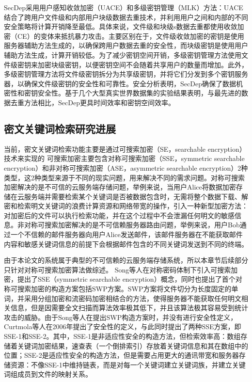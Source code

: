 \documentclass[promaster]{thesis-uestc}
\begin{document}
SecDep采用用户感知收敛加密（UACE）和多级密钥管理（MLK）方法：UACE结合了跨用户文件级和内部用户块级数据去重技术，并利用用户之间和内部的不同安全策略将计算开销降至最低。具体来说，文件级和块级s数据去重都使用收敛加密（CE）的变体来抵抗暴力攻击。主要区别在于，文件级收敛加密的密钥是使用服务器辅助方法生成的，以确保跨用户数据去重的安全性，而块级密钥是使用用户辅助方法生成，计算开销较低。为了减少密钥空间开销，多级密钥管理方法使用文件级密钥来加密块级密钥，以便密钥空间不会随着共享用户的数量而增加。此外，多级密钥管理方法将文件级密钥拆分为共享级密钥，并将它们分发到多个密钥服务器，以确保文件级密钥的安全性和可靠性。安全分析表明，SecDep确保了数据机密性和密钥安全性。基于几个大型真实世界数据集的实验结果表明，与最先进的数据去重方法相比，SecDep更具时间效率和密钥空间效率。

\subsection{密文关键词检索研究进展}\label{密文关键词检索技术研究进展}
当前，密文关键词检索功能主要是通过可搜索加密（SE，searchable encryption）技术来实现的
可搜索加密主要包含对称可搜索加密（SSE，symmetric searchable encryption）和非对称可搜索加密（ASE，asymmetric searchable encryption）2种类型，这2种类型来源于不同的现实问题，用来解决不同的需求问题。对称可搜索加密解决的是不可信的云服务端存储问题，举例来说，当用户Alice将数据加密存储在云服务端并需要检索某个关键词是否被数据包含时，无需将整个数据下载、解密和检索明文关键词的浪费计算资源和网络带宽的操作，引入一种新型加密方法：对加密后的文件可以执行检索功能，并在这个过程中不会泄漏任何明文的敏感信息。非对称可搜索加密解决的是不可信赖服务器路由问题，举例来说，用户Bob通过一个不信赖的邮件服务器向用户Alice发送邮件，该邮件服务器在不能获取邮件内容和敏感关键词信息的前提下会根据邮件包含的不同关键词发送到不同的终端。


由于本论文的系统属于典型的不可信赖的云服务端存储系统，所以本章节后续部分只针对对称可搜索加密算法做综述。
Song等人在对称密码体制下引入可搜索加密，提出了SSE（symmetric searchable encryption）概念，同时也提出了首个对称可搜索加密的构造方案包括SWP方案。SWP方案将文件切分为长度固定的单词，并采用分组加密和流密码加密相结合的方法，使得服务器不能获取任何明文相关信息，但是因需要全文扫描而算法效率极其低下，并且该算法极其容易受到统计攻击的威胁。由于Song等人在提出SWP构造方案时，并没有进行安全性定义，Curtmola等人在2006年提出了安全性的定义，与此同时提出了两种SSE方案，即SSE-1和SSE-2。其中，SSE-1是非适应性安全的构造方法，但检索效率高：数组存储着关键词加密结果，速查表（一个倒排索引）存放着关键词信息和其在数组中的位置；SSE-2是适应性安全的构造方法，但是需要占用更大的通讯带宽和服务器存储资源：不像SSE-1中维持链表，而是对每一个关键词建立关键词族，并建立关键词组成员到文件的映射关系。
\end{document}
